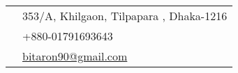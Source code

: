 \documentclass[10pt]{article} %
\begin{document}
{\begin{minipage}[t]{0.5\textwidth}

\end{minipage} %
\hfill
\begin{minipage}[t]{0.44\textwidth} %
\vspace{0pt} %

%

\begin{minipage}[t]{0.44\textwidth} %
\vspace{0pt} 
{\raggedright	
\colorbox{shade}{\textcolor{text1}{
\begin{tabular}{c|p{7cm}}
\raisebox{-4pt}{\textifsymbol{18}} & 353/A, Khilgaon, Tilpapara , Dhaka-1216 \\ %
\raisebox{-3pt}{\Mobilefone} & +880-01791693643 \\ %
\raisebox{-1pt}{\Letter} & \href{mailto:bitaron90@gmail.com}{bitaron90@gmail.com} \\ %
\end{tabular}
}
}\\[10pt]
}
\end{minipage}
%


\end{minipage}}
\end{document}
